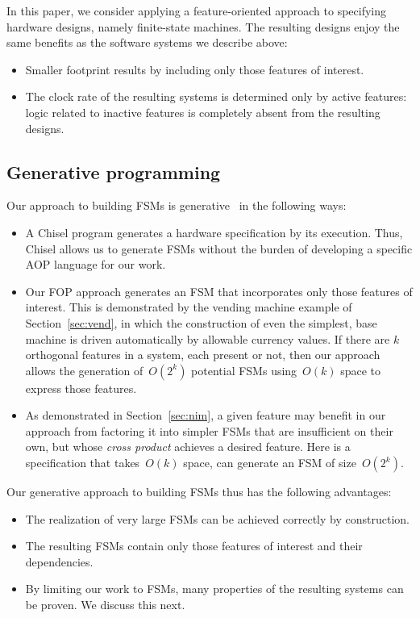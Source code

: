 \documentclass[sigplan,anonymous,review]{acmart}
\begin{document}
In this paper, we consider applying a feature-oriented approach to specifying hardware designs, namely finite-state machines.
The resulting designs enjoy the same benefits as the software systems we describe above:
\begin{itemize}
    \item Smaller footprint results by including only those features of interest.
    \item The clock rate of the resulting systems is determined only by active features:  logic related to inactive features is completely absent from the resulting designs.
\end{itemize}

\subsection{Generative programming}\label{sec:priorgen}
Our approach to building FSMs is generative~\cite{10.1007/11527800_24} in the following ways:
\begin{itemize}
    \item A Chisel program generates a hardware specification by its execution.  Thus, Chisel allows us to generate FSMs without the burden of developing a specific AOP language for our work.
    \item Our FOP approach generates an FSM that incorporates only those features of interest.  This is demonstrated by the vending machine example of Section~\ref{sec:vend}, in which the construction of even the simplest, base machine is driven automatically by allowable currency values.  If there are $k$ orthogonal features in a system, each present or not, then our approach allows the generation of~$O(2^{k})$ potential FSMs using~$O(k)$ space to express those features.
    \item As demonstrated in Section~\ref{sec:nim}, a given feature may benefit in our approach from factoring it into simpler FSMs that are insufficient on their own, but whose \emph{cross product} achieves a desired feature.  Here is a specification that takes~$O(k)$ space, can generate an FSM of size~$O(2^{k})$.
\end{itemize}
Our generative approach to building FSMs thus has the following advantages:
\begin{itemize}
    \item The realization of very large FSMs can be achieved correctly by construction.
    \item The resulting FSMs contain only those features of interest and their dependencies.
    \item By limiting our work to FSMs, many properties of the resulting systems can be proven.  We discuss this next.
\end{itemize}
  
\end{document}
